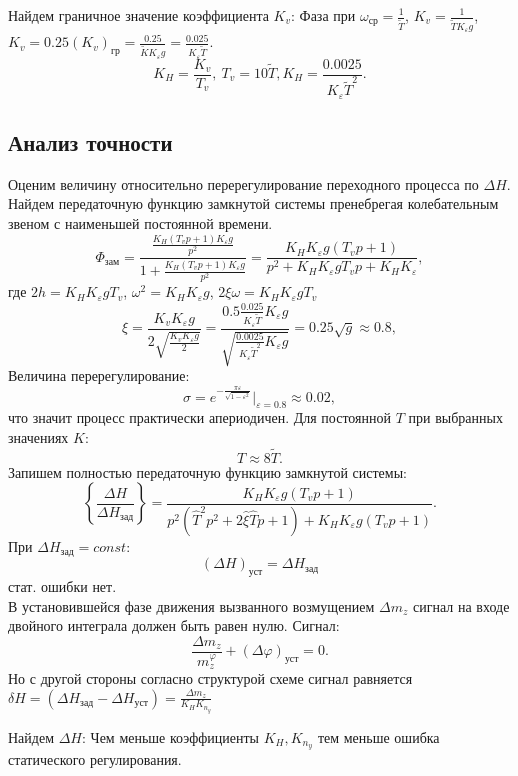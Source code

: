 \documentclass{article}
\begin{document}
Найдем граничное значение коэффициента $K_v$:
Фаза при $\omega_\text{ср} = \frac{1}{\tilde{T}} $, $K_v = \frac{1}{\tilde{T}
K_\varepsilon g}$, $K_v = 0.25 (K_v)_\text{гр} = \frac{0.25}{\tilde{K}
K_\varepsilon g} = \frac{0.025}{K_\varepsilon \tilde{T}}$.
\[
    K_H = \frac{K_v}{T_v}, \ T_v = 10 \tilde{T}, K_H =
    \frac{0.0025}{K_\varepsilon \tilde{T}^2}
    .\]

\subsection{Анализ точности}
Оценим величину относительно перерегулирование переходного процесса по $\Delta
H$. Найдем передаточную функцию замкнутой системы пренебрегая колебательным
звеном с наименьшей постоянной времени.
\[
    \Phi_\text{зам} = \frac{\frac{K_H(T_v p + 1) K_\varepsilon g}{p^2}}{1 +
    \frac{K_H(T_v p + 1) K_\varepsilon g}{p^2}} = \frac{K_H K_\varepsilon g(T_v
p + 1)}{ p^2 +  K_H K_\varepsilon g T_v p +  K_H K_\varepsilon}
    ,\]
где $2h = K_H K_\varepsilon g T_v$, $\omega^2 = K_H K_\varepsilon g$, $2 \xi
\omega = K_H K_\varepsilon g T_v$
\[
    \xi = \frac{K_v K_\varepsilon g}{2 \sqrt{\frac{K_v K_\varepsilon g}{2}}} =
    \frac{0.5 \frac{0.025}{K_\varepsilon \tilde{T}} K_\varepsilon
    g}{\sqrt{\frac{0.0025}{K_\varepsilon \tilde{T}^2} K_\varepsilon  g}} = 0.25
    \sqrt{g} \approx 0.8,
\]
Величина перерегулирование:
\[
    \sigma = e^{- \frac{\pi \varepsilon}{\sqrt{1 - \varepsilon^2}}}
    |_{\varepsilon = 0.8} \approx 0.02,
\]
что значит процесс практически апериодичен. Для постоянной $T$ при выбранных
значениях $K$:
\[
    T \approx 8 \tilde{T}
    .\]
Запишем полностью передаточную функцию замкнутой системы:
\[
    \left\{ \frac{\Delta H }{\Delta H_\text{зад}} \right\}  = \frac{K_H
    K_\varepsilon g (T_v p + 1)}{p^2 (\hat{T}^2 p^2 + 2 \hat{\xi} \hat{T}p + 1)
    + K_H K_\varepsilon g (T_v p +1)}.
\]
При $\Delta H_\text{зад} = const$:
\[
    (\Delta H)_\text{уст} = \Delta H_\text{зад}
\]
стат. ошибки нет.\\
В установившейся фазе движения вызванного возмущением $ \Delta m_z $ сигнал на
входе двойного интеграла должен быть равен нулю.
Сигнал:
\[
    \frac{\Delta m_z}{m_z^\varphi} + (\Delta \varphi)_\text{уст} = 0
    .\]
Но с другой стороны согласно структурой схеме сигнал равняется $\delta H =
(\Delta H_\text{зад} - \Delta H_\text{уст}) = \frac{\Delta m_z}{K_H K_{n_y}}$

Найдем $\Delta H$:
Чем меньше коэффициенты $K_H, K_{n_y}$ тем меньше ошибка статического
регулирования.
\end{document}

